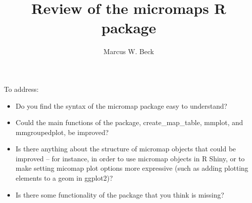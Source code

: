 \documentclass[letterpaper,12pt]{article}\usepackage[]{graphicx}\usepackage[]{color}
\begin{document}
\title{Review of the micromaps R package}
\author{Marcus W. Beck}
\maketitle

To address:
\begin{itemize}
\item Do you find the syntax of the micromap package easy to understand?
\item Could the main functions of the package, create\_map\_table, mmplot, and mmgroupedplot, be improved?
\item Is there anything about the structure of micromap objects that could be improved – for instance, in order to use micromap objects in R Shiny, or to make setting micomap plot options more expressive (such as adding plotting elements to a geom in ggplot2)?
\item Is there some functionality of the package that you think is missing?
\end{itemize}
\end{document}
